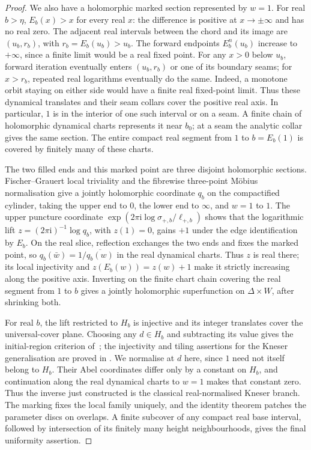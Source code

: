 \documentclass[11pt]{amsart}
\theoremstyle{definition}
\newcommand{\ii}{\mathrm{i}}
\begin{document}
\begin{proof}
We also have a holomorphic marked section represented by $w=1$.
For real $b>\eta$, $E_b(x)>x$ for every real $x$: the difference is
positive at $x\to\pm\infty$ and has no real zero.  The adjacent real
intervals between the chord and its image are $(u_b,r_b)$, with
$r_b=E_b(u_b)>u_b$.  The forward endpoints $E_b^n(u_b)$ increase to
$+\infty$, since a finite limit would be a real fixed point.  For any
$x>0$ below $u_b$, forward iteration eventually enters $(u_b,r_b)$
or one of its boundary seams; for $x>r_b$, repeated real logarithms
eventually do the same.
Indeed, a monotone orbit staying on either side would have a finite
real fixed-point limit.  Thus these dynamical translates and their
seam collars cover the positive real axis.  In particular, $1$ is
in the interior of one such interval or on a seam.  A finite chain of
holomorphic dynamical charts represents it near $b_0$; at a seam the
analytic collar gives the same section.  The entire compact real
segment from $1$ to $b=E_b(1)$ is covered by finitely many of these
charts.

The two filled ends and this marked point are three disjoint
holomorphic sections.  Fischer--Grauert local triviality
\cite{FischerGrauert1965} and the fibrewise three-point M\"obius
normalisation give a jointly holomorphic coordinate $q_b$ on the
compactified cylinder, taking the upper end to $0$, the lower end to
$\infty$, and $w=1$ to $1$.  The upper puncture coordinate
$\exp(2\pi\ii\log\sigma_{+,b}/\ell_{+,b})$ shows that the logarithmic
lift $z=(2\pi\ii)^{-1}\log q_b$, with $z(1)=0$, gains $+1$ under the edge
identification by $E_b$.  On the real slice, reflection exchanges the
two ends and fixes the marked point, so $q_b(\bar w)=1/\overline{q_b(w)}$
in the real dynamical charts.  Thus $z$ is real there; its local
injectivity and $z(E_b(w))=z(w)+1$ make it strictly increasing along
the positive axis.  Inverting on the finite
chart chain covering the real segment from $1$ to $b$ gives a jointly
holomorphic superfunction on $\Delta\times W$, after shrinking both.

For real $b$, the lift restricted to $H_b$ is injective and its integer
translates cover the universal-cover plane.  Choosing any $d\in H_b$
and subtracting its value gives the initial-region criterion
of~\cite[Thm.~1]{TrappmannKouznetsov2011}; the injectivity and tiling
assertions for the Kneser generalisation are proved in
\cite[Thm.~5]{TrappmannKouznetsov2011}.  We normalise at $d$ here,
since $1$ need not itself belong to $H_b$.
Their Abel coordinates differ only by a constant on $H_b$, and
continuation along the real dynamical charts to $w=1$ makes that
constant zero.  Thus the inverse just
constructed is the classical real-normalised Kneser branch.
The marking fixes the local family uniquely, and the identity theorem
patches the parameter discs on overlaps.  A finite subcover of any
compact real base interval, followed by intersection of its finitely
many height neighbourhoods, gives the final uniformity assertion.
\end{proof}
\end{document}
